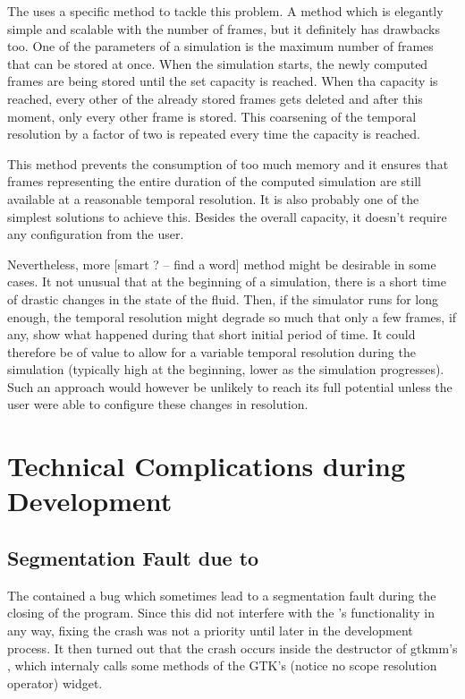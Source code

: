 \documentclass[11pt,a4paper,twoside,openright]{report}
\begin{document}
The \software{} uses a specific method to tackle this problem. A method which is elegantly simple and scalable with the number of frames, but it definitely has drawbacks too. One of the parameters of a simulation is the maximum number of frames that can be stored at once. When the simulation starts, the newly computed frames are being stored until the set capacity is reached. When tha capacity is reached, every other of the already stored frames gets deleted and after this moment, only every other frame is stored. This coarsening of the temporal resolution by a factor of two is repeated every time the capacity is reached.

This method prevents the consumption of too much memory and it ensures that frames representing the entire duration of the computed simulation are still available at a reasonable temporal resolution. It is also probably one of the simplest solutions to achieve this. Besides the overall capacity, it doesn't require any configuration from the user.

Nevertheless, more [smart ? -- find a word] method might be desirable in some cases. It not unusual that at the beginning of a simulation, there is a short time of drastic changes in the state of the fluid. Then, if the simulator runs for long enough, the temporal resolution might degrade so much that only a few frames, if any, show what happened during that short initial period of time. It could therefore be of value to allow for a variable temporal resolution during the simulation (typically high at the beginning, lower as the simulation progresses). Such an approach would however be unlikely to reach its full potential unless the user were able to configure these changes in resolution.

\section{Technical Complications during Development}

\subsection{Segmentation Fault due to }

The \software{} contained a bug which sometimes lead to a segmentation fault during the closing of the program. Since this did not interfere with the \software{}'s functionality in any way, fixing the crash was not a priority until later in the development process. It then turned out that the crash occurs inside the destructor of gtkmm's , which internaly calls some methods of the GTK's  (notice no scope resolution operator) widget.
\end{document}
